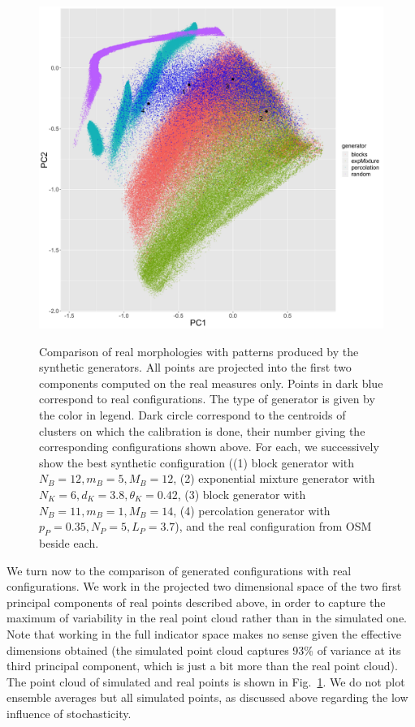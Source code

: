 \documentclass[letterpaper]{article}
\begin{document}
\begin{figure}
    \\
    \includegraphics[width=\linewidth]{lhscalib_projrealpcs}
    \caption{Comparison of real morphologies with patterns produced by the synthetic generators. All points are projected into the first two components computed on the real measures only. Points in dark blue correspond to real configurations. The type of generator is given by the color in legend. Dark circle correspond to the centroids of clusters on which the calibration is done, their number giving the corresponding configurations shown above. For each, we successively show the best synthetic configuration ((1) block generator with $N_B=12,m_B=5,M_B=12$, (2) exponential mixture generator with $N_K=6,d_K=3.8,\theta_K=0.42$, (3) block generator with $N_B=11,m_B=1,M_B=14$, (4) percolation generator with $p_P=0.35,N_P=5,L_P=3.7$), and the real configuration from OSM beside each.}
    \label{fig:lhs}
\end{figure}

We turn now to the comparison of generated configurations with real configurations. We work in the projected two dimensional space of the two first principal components of real points described above, in order to capture the maximum of variability in the real point cloud rather than in the simulated one. Note that working in the full indicator space makes no sense given the effective dimensions obtained (the simulated point cloud captures 93\% of variance at its third principal component, which is just a bit more than the real point cloud).
The point cloud of simulated and real points is shown in Fig.~\ref{fig:lhs}. We do not plot ensemble averages but all simulated points, as discussed above regarding the low influence of stochasticity.
\end{document}
